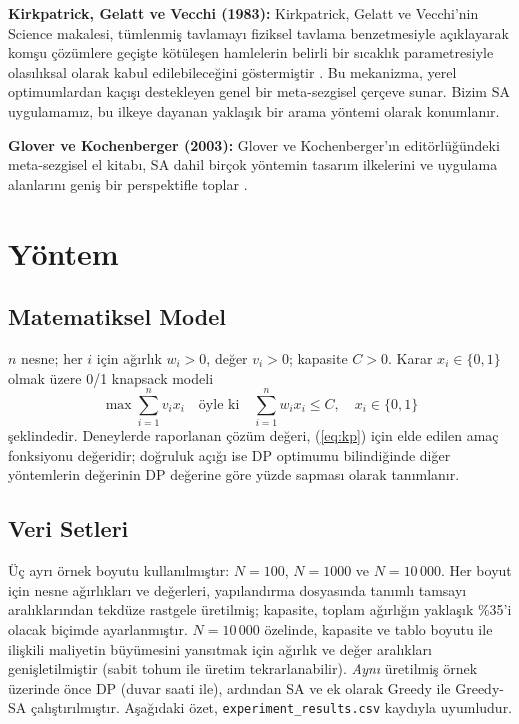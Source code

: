 \documentclass[conference,a4paper]{IEEEtran}
\begin{document}
\textbf{Kirkpatrick, Gelatt ve Vecchi (1983):} Kirkpatrick, Gelatt ve Vecchi'nin Science makalesi, tümlenmiş tavlamayı fiziksel tavlama benzetmesiyle açıklayarak komşu çözümlere geçişte kötüleşen hamlelerin belirli bir sıcaklık parametresiyle olasılıksal olarak kabul edilebileceğini göstermiştir \cite{kirkpatrick1983optimization}. Bu mekanizma, yerel optimumlardan kaçışı destekleyen genel bir meta-sezgisel çerçeve sunar. Bizim SA uygulamamız, bu ilkeye dayanan yaklaşık bir arama yöntemi olarak konumlanır.

\textbf{Glover ve Kochenberger (2003):} Glover ve Kochenberger'ın editörlüğündeki meta-sezgisel el kitabı, SA dahil birçok yöntemin tasarım ilkelerini ve uygulama alanlarını geniş bir perspektifle toplar \cite{glover2003handbook}.

\section{Yöntem}

\subsection{Matematiksel Model}
$n$ nesne; her $i$ için ağırlık $w_i>0$, değer $v_i>0$; kapasite $C>0$. Karar $x_i\in\{0,1\}$ olmak üzere 0/1 knapsack modeli
\begin{equation}
\max \sum_{i=1}^{n} v_i x_i
\quad \text{öyle ki} \quad
\sum_{i=1}^{n} w_i x_i \leq C,\quad x_i\in\{0,1\}
\label{eq:kp}
\end{equation}
şeklindedir. Deneylerde raporlanan çözüm değeri, (\ref{eq:kp}) için elde edilen amaç fonksiyonu değeridir; doğruluk açığı ise DP optimumu bilindiğinde diğer yöntemlerin değerinin DP değerine göre yüzde sapması olarak tanımlanır.

\subsection{Veri Setleri}
Üç ayrı örnek boyutu kullanılmıştır: $N{=}100$, $N{=}1000$ ve $N{=}10\,000$. Her boyut için nesne ağırlıkları ve değerleri, yapılandırma dosyasında tanımlı tamsayı aralıklarından tekdüze rastgele üretilmiş; kapasite, toplam ağırlığın yaklaşık \%35'i olacak biçimde ayarlanmıştır. $N{=}10\,000$ özelinde, kapasite ve tablo boyutu ile ilişkili maliyetin büyümesini yansıtmak için ağırlık ve değer aralıkları genişletilmiştir (sabit tohum ile üretim tekrarlanabilir). \emph{Aynı} üretilmiş örnek üzerinde önce DP (duvar saati ile), ardından SA ve ek olarak Greedy ile Greedy-SA çalıştırılmıştır. Aşağıdaki özet, \texttt{experiment\_results.csv} kaydıyla uyumludur.
\end{document}
